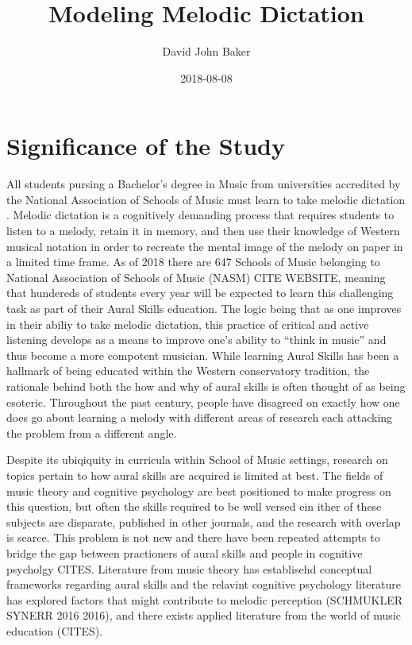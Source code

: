 \documentclass[]{book}
\title{Modeling Melodic Dictation}
\author{David John Baker}
\date{2018-08-08}
\theoremstyle{definition}
\theoremstyle{definition}
\theoremstyle{definition}
\theoremstyle{remark}
\begin{document}
\maketitle

{
\setcounter{tocdepth}{1}
\tableofcontents
}
\hypertarget{significance-of-the-study}{%
\chapter{Significance of the Study}\label{significance-of-the-study}}

All students pursing a Bachelor's degree in Music from universities
accredited by the National Association of Schools of Music must learn to
take melodic dictation \citep[ Section
VIII.6.B.2.A]{NationalAssociationSchools2018}. Melodic dictation is a
cognitively demanding process that requires students to listen to a
melody, retain it in memory, and then use their knowledge of Western
musical notation in order to recreate the mental image of the melody on
paper in a limited time frame. As of 2018 there are 647 Schools of Music
belonging to National Association of Schools of Music (NASM) CITE
WEBSITE, meaning that hundereds of students every year will be expected
to learn this challenging task as part of their Aural Skills education.
The logic being that as one improves in their abiliy to take melodic
dictation, this practice of critical and active listening develops as a
means to improve one's ability to ``think in music'' and thus become a
more compotent musician. While learning Aural Skills has been a hallmark
of being educated within the Western conservatory tradition, the
rationale behind both the how and why of aural skills is often thought
of as being esoteric. Throughout the past century, people have disagreed
on exactly how one does go about learning a melody with different areas
of research each attacking the problem from a different angle.

Despite its ubiqiquity in curricula within School of Music settings,
research on topics pertain to how aural skills are acquired is limited
at best. The fields of music theory and cognitive psychology are best
positioned to make progress on this question, but often the skills
required to be well versed ein ither of these subjects are disparate,
published in other journals, and the research with overlap is scarce.
This problem is not new and there have been repeated attempts to bridge
the gap between practioners of aural skills and people in cognitive
psycholgy CITES. Literature from music theory has establisehd conceptual
frameworks regarding aural skills
\citet{karpinskiAuralSkillsAcquisition2000} and the relavint cognitive
psychology literature has explored factors that might contribute to
melodic perception (SCHMUKLER SYNERR 2016 2016), and there exists
applied literature from the world of music education (CITES).
\end{document}
